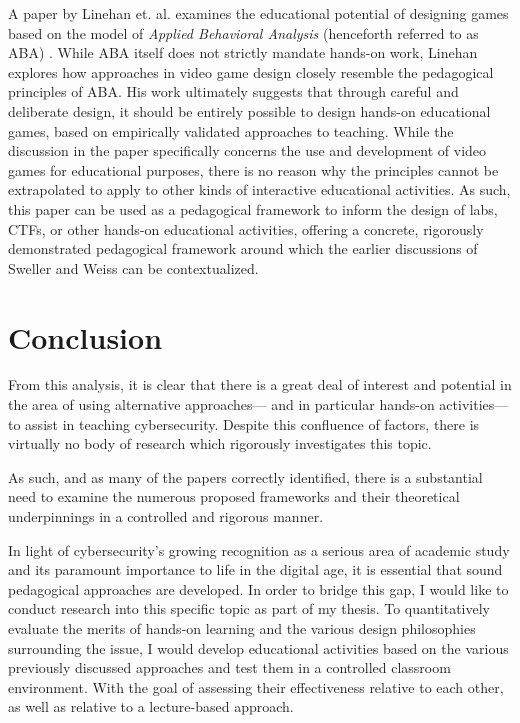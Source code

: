     A paper by Linehan et. al. examines the educational potential of designing games based on the model of \emph{Applied Behavioral Analysis} (henceforth referred to as ABA) \cite{C-Linehan}. %
While ABA itself does not strictly mandate hands-on work, Linehan explores how approaches in video game design closely resemble the pedagogical principles of ABA. His work ultimately suggests that through careful and deliberate design, it should be entirely possible to design hands-on educational games, based on empirically validated approaches to teaching. %
While the discussion in the paper specifically concerns the use and development of video games for educational purposes, there is no reason why the principles cannot be extrapolated to apply to other kinds of interactive educational activities. %
As such, this paper can be used as a pedagogical framework to inform the design of labs, CTFs, or other hands-on educational activities, offering a concrete, rigorously demonstrated pedagogical framework around which the earlier discussions of Sweller and Weiss can be contextualized. 


\section{Conclusion}

    From this analysis, it is clear that there is a great deal of interest and potential in the area of using alternative approaches---%
and in particular hands-on activities---%
to assist in teaching cybersecurity. %
Despite this confluence of factors, there is virtually no body of research which rigorously investigates this topic. %

As such, and as many of the papers correctly identified, there is a substantial need to examine the numerous proposed frameworks and their theoretical underpinnings in a controlled and rigorous manner. 

    In light of cybersecurity's growing recognition as a serious area of academic study and its paramount importance to life in the digital age, it is essential that sound pedagogical approaches are developed. %
In order to bridge this gap, I would like to conduct research into this specific topic as part of my thesis. %
To quantitatively evaluate the merits of hands-on learning and the various design philosophies surrounding the issue, I would develop educational activities based on the various previously discussed approaches and test them in a controlled classroom environment. %
With the goal of assessing their effectiveness relative to each other, as well as relative to a lecture-based approach. %
